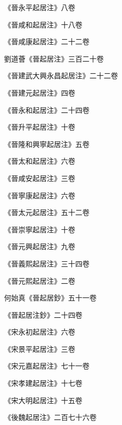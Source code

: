 \begin{pinyinscope}
 《晉永平起居注》八卷



 《晉咸和起居注》十八卷



 《晉咸康起居注》二十二卷



 劉道薈《晉起居注》三百二十卷



 《晉建武大興永昌起居注》二十二卷



 《晉建元起居注》四卷



 《晉永和起居注》二十四卷



 《晉升平起居注》十卷



 《晉隆和興寧起居注》五卷



 《晉太和起居注》六卷



 《晉咸安起居注》三卷



 《晉寧康起居注》六卷



 《晉太元起居注》五十二卷



 《晉崇寧起居注》十卷



 《晉元興起居注》九卷



 《晉義熙起居注》三十四卷



 《晉元熙起居注》二卷



 何始真《晉起居鈔》五十一卷



 《晉起居注鈔》二十四卷



 《宋永初起居注》六卷



 《宋景平起居注》三卷



 《宋元嘉起居注》七十一卷



 《宋孝建起居注》十七卷



 《宋大明起居注》十五卷



 《後魏起居注》二百七十六卷




\end{pinyinscope}
